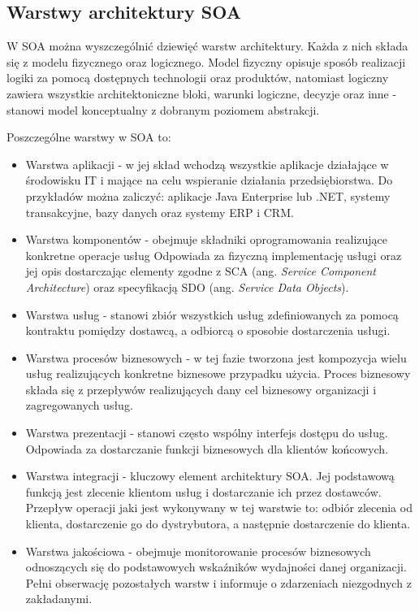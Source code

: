 \subsection{Warstwy architektury SOA}
W SOA można wyszczególnić dziewięć warstw architektury. Każda z nich składa się z modelu fizycznego oraz logicznego. Model fizyczny opisuje sposób realizacji logiki za pomocą dostępnych technologii oraz produktów, natomiast logiczny zawiera wszystkie architektoniczne bloki, warunki logiczne, decyzje oraz inne - stanowi model konceptualny z dobranym poziomem abstrakcji.

Poszczególne warstwy w SOA to:
\begin{itemize}
\item{Warstwa aplikacji - w jej skład wchodzą wszystkie aplikacje działające w środowisku IT i mające na celu wspieranie działania przedsiębiorstwa. Do przykładów można zaliczyć: aplikacje Java Enterprise lub .NET, systemy transakcyjne, bazy danych oraz systemy ERP i CRM.}
\item{Warstwa komponentów - obejmuje składniki oprogramowania realizujące konkretne operacje usług Odpowiada za fizyczną implementację usługi oraz jej opis dostarczając elementy zgodne z SCA (ang. \textit{Service Component Architecture}) oraz specyfikacją SDO (ang. \textit{Service Data Objects}).}
\item{Warstwa usług - stanowi zbiór wszystkich usług zdefiniowanych za pomocą kontraktu pomiędzy dostawcą, a odbiorcą o sposobie dostarczenia usługi.}
\item{Warstwa procesów biznesowych - w tej fazie tworzona jest kompozycja wielu usług realizujących konkretne biznesowe przypadku użycia. Proces biznesowy składa się z przepływów realizujących dany cel biznesowy organizacji i zagregowanych usług.}
\item{Warstwa prezentacji - stanowi często wspólny interfejs dostępu do usług. Odpowiada za dostarczanie funkcji biznesowych dla klientów końcowych.}
\item{Warstwa integracji - kluczowy element architektury SOA. Jej podstawową funkcją jest zlecenie klientom usług i dostarczanie ich przez dostawców. Przepływ operacji jaki jest wykonywany w tej warstwie to: odbiór zlecenia od klienta, dostarczenie go do dystrybutora, a następnie dostarczenie do klienta.}
\item{Warstwa jakościowa - obejmuje monitorowanie procesów biznesowych odnoszących się do podstawowych wskaźników wydajności danej organizacji. Pełni obserwację pozostałych warstw i informuje o zdarzeniach niezgodnych z zakładanymi.}

\end{itemize}
